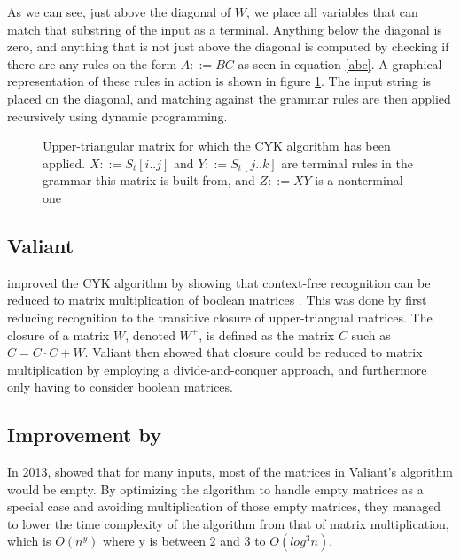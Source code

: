 \documentclass[a4paper,12pt,twosided]{report}
\renewcommand\cite{\citep}
\newcommand{\subt}[3] { 
  \draw[grid] (#1,#1) -- (#1,#2) node[inChart] {#3} -- (#2,#2);
  \fill[color=black] (#1,#2) circle (2pt)
 }
\newcommand{\mrk}[2]{\node[inChart] at (#1,#1) {#2}}
\begin{document}
As we can see, just above the diagonal of $W$, we place all variables that can
match that substring of the input as a terminal. Anything below the diagonal is
zero, and anything that is not just above the diagonal is computed by checking
if there are any rules on the form $A ::= BC$ as seen in equation \ref{abc}. A
graphical representation of these rules in action is shown in figure
\ref{exchart}. The input string is placed on the diagonal, and matching against
the grammar rules are then applied recursively using dynamic programming. 

\begin{figure}[H]
  \centering
  \caption{\label{exchart}Upper-triangular matrix for which the CYK algorithm
           has been applied. $X ::= S_t[i..j]$ and $Y ::= S_t[j..k]$ are
           terminal rules in the grammar this matrix is built from, and $Z
           ::= XY$ is a nonterminal one} 
\end{figure}

\subsection{Valiant}
\citet{Valiant75} improved the CYK algorithm by showing that
context-free recognition can be reduced to matrix multiplication of boolean
matrices \cite{Valiant75}. This was done by first reducing recognition to the
transitive closure of upper-triangual matrices.  The closure of a matrix $W$,
denoted $W^+$, is defined as the matrix $C$ such as $C = C \cdot C + W$.
Valiant then showed that closure could be reduced to matrix multiplication by
employing a divide-and-conquer approach, and furthermore only having to consider
boolean matrices. 

\subsection{Improvement by \citeauthor{parparsepaper}}
In 2013, \citet{parparsepaper} showed that for many inputs, most of the matrices
in Valiant's algorithm would be empty. By optimizing the algorithm to handle
empty matrices as a special case and avoiding multiplication of those empty
matrices, they managed to lower the time complexity of the algorithm from that
of matrix multiplication, which is $O(n^y)$ where y is between 2 and 3 to
$O(log^3 n)$. 
\end{document}
